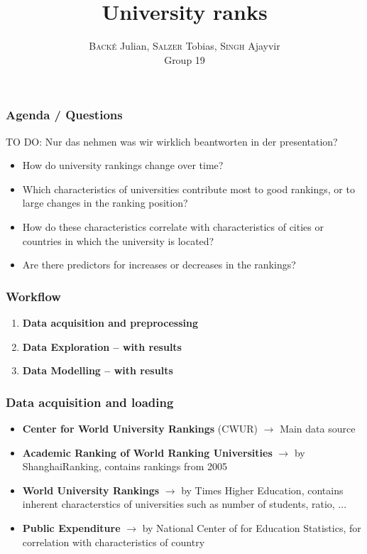 \documentclass[mathserif,notheorems,11pt]{beamer}
\title{\textbf{University ranks}}
\author{\textsc{Back\'{e}} Julian, \textsc{Salzer} Tobias, \textsc{Singh} Ajayvir\\
Group 19}
\date{}
\begin{document}
\maketitle
\linespread{1.2}

\begin{frame} 
\frametitle{Agenda / Questions}
TO DO: Nur das nehmen was wir wirklich beantworten in der presentation?
\begin{itemize}
	\item How do university rankings change over time? 
	
	\item Which characteristics of universities contribute most to good rankings, or to large changes in the ranking position? 
	
	\item How do these characteristics correlate with characteristics of cities or countries in which the university is
	located? 
	
	\item Are there predictors for increases or decreases in the rankings?
\end{itemize}

\end{frame}

\begin{frame} 
\frametitle{Workflow}


\begin{enumerate}
\item \textbf{Data acquisition and preprocessing}

\item \textbf{Data Exploration -- with results}

\item \textbf{Data Modelling -- with results}
\end{enumerate}
\end{frame}

\begin{frame} 
\frametitle{Data acquisition and loading}
\begin{itemize}
\item \textbf{Center for World University Rankings} (CWUR) $\rightarrow$ Main data source
\item \textbf{Academic Ranking of World Ranking Universities} $\rightarrow$ by ShanghaiRanking, contains rankings from 2005
\item \textbf{World University Rankings } $\rightarrow$ by Times Higher Education, contains inherent characterstics of universities such as number of students, ratio, ...
\item \textbf{Public Expenditure} $\rightarrow$ by National Center of for Education Statistics, for correlation with characteristics of country

\end{itemize}

\end{frame}
\end{document}
